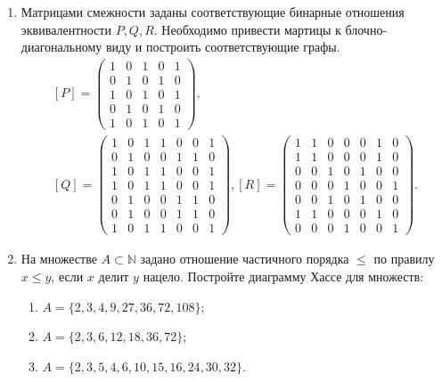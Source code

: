 \begin{enumerate}
    \item Матрицами смежности заданы соответствующие бинарные отношения эквивалентности $P,Q,R$. Необходимо привести мартицы к блочно-диагональному виду и построить соответствующие графы.
    \[
        \begin{split}
            [P]=\begin{pmatrix}
                1&0&1&0&1\\
                0&1&0&1&0\\
                1&0&1&0&1\\
                0&1&0&1&0\\
                1&0&1&0&1
            \end{pmatrix},\\
            [Q]=\begin{pmatrix}
                1&0&1&1&0&0&1\\
                0&1&0&0&1&1&0\\
                1&0&1&1&0&0&1\\
                1&0&1&1&0&0&1\\
                0&1&0&0&1&1&0\\
                0&1&0&0&1&1&0\\
                1&0&1&1&0&0&1
            \end{pmatrix},
            [R]=\begin{pmatrix}
                1&1&0&0&0&1&0\\
                1&1&0&0&0&1&0\\
                0&0&1&0&1&0&0\\
                0&0&0&1&0&0&1\\
                0&0&1&0&1&0&0\\
                1&1&0&0&0&1&0\\
                0&0&0&1&0&0&1
            \end{pmatrix}.     
        \end{split}
    \]
    
    \item На множестве $A\subset\mathbb{N}$ задано отношение частичного порядка $\leq$ по правилу $x\leq y$, если $x$ делит $y$ нацело. Постройте диаграмму Хассе для множеств:
    \begin{enumerate}
        \item $A=\{2,3,4,9,27,36,72,108\}$;
        \item $A=\{2,3,6,12,18,36,72\}$;
        \item $A=\{2,3,5,4,6,10,15,16,24,30,32\}$.
    \end{enumerate}
    

\end{enumerate}
